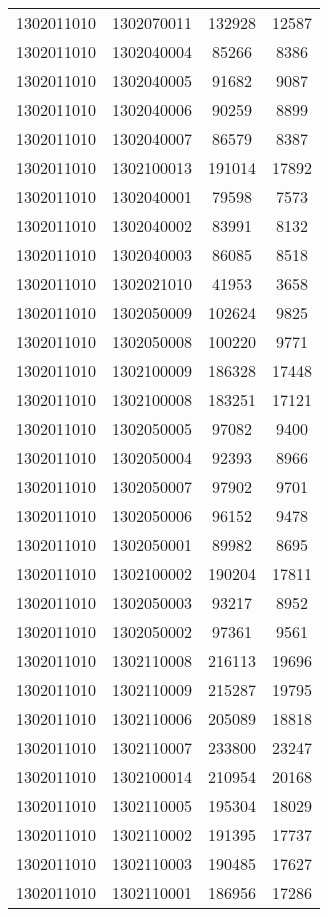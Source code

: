 \begin{longtable}[h]{llcc}
		1302011010 & 1302070011 & 132928 & 12587\\
		1302011010 & 1302040004 & 85266 & 8386\\
		1302011010 & 1302040005 & 91682 & 9087\\
		1302011010 & 1302040006 & 90259 & 8899\\
		1302011010 & 1302040007 & 86579 & 8387\\
		1302011010 & 1302100013 & 191014 & 17892\\
		1302011010 & 1302040001 & 79598 & 7573\\
		1302011010 & 1302040002 & 83991 & 8132\\
		1302011010 & 1302040003 & 86085 & 8518\\
		1302011010 & 1302021010 & 41953 & 3658\\
		1302011010 & 1302050009 & 102624 & 9825\\
		1302011010 & 1302050008 & 100220 & 9771\\
		1302011010 & 1302100009 & 186328 & 17448\\
		1302011010 & 1302100008 & 183251 & 17121\\
		1302011010 & 1302050005 & 97082 & 9400\\
		1302011010 & 1302050004 & 92393 & 8966\\
		1302011010 & 1302050007 & 97902 & 9701\\
		1302011010 & 1302050006 & 96152 & 9478\\
		1302011010 & 1302050001 & 89982 & 8695\\
		1302011010 & 1302100002 & 190204 & 17811\\
		1302011010 & 1302050003 & 93217 & 8952\\
		1302011010 & 1302050002 & 97361 & 9561\\
		1302011010 & 1302110008 & 216113 & 19696\\
		1302011010 & 1302110009 & 215287 & 19795\\
		1302011010 & 1302110006 & 205089 & 18818\\
		1302011010 & 1302110007 & 233800 & 23247\\
		1302011010 & 1302100014 & 210954 & 20168\\
		1302011010 & 1302110005 & 195304 & 18029\\
		1302011010 & 1302110002 & 191395 & 17737\\
		1302011010 & 1302110003 & 190485 & 17627\\
		1302011010 & 1302110001 & 186956 & 17286\\

\end{longtable}
